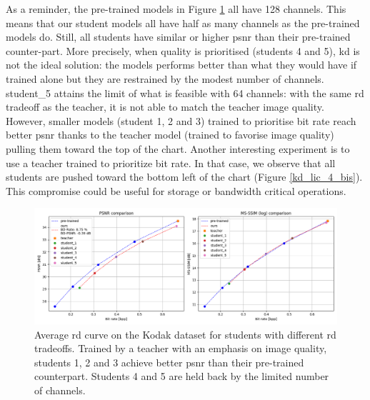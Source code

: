 \documentclass{article}
\begin{document}
As a reminder, the pre-trained models in Figure \ref{kd_lic_4} all have 128 channels. This means that our student models all have half as many channels as the pre-trained models do. Still, all students have similar or higher \acrshort{psnr} than their pre-trained counter-part. More precisely, when quality is prioritised (students 4 and 5), \acrshort{kd} is not the ideal solution: the models performs better than what they would have if trained alone but they are restrained by the modest number of channels. \textsf{student\_5} attains the limit of what is feasible with 64 channels: with the same \acrshort{rd} tradeoff as the teacher, it is not able to match the teacher image quality. However, smaller models (student 1, 2 and 3) trained to prioritise bit rate reach better \acrshort{psnr} thanks to the teacher model (trained to favorise image quality) pulling them toward the top of the chart. Another interesting experiment is to use a teacher trained to prioritize bit rate. In that case, we observe that all students are pushed toward the bottom left of the chart (Figure \ref{kd_lic_4_bis}). This compromise could be useful for storage or bandwidth critical operations.

\begin{figure}
    \centering
    \includegraphics[width=15cm]{kd_lic_rd_lambda_1.png}
    \caption[Average \acrshort{rd} curve on the Kodak dataset for students with different \acrshort{rd} tradeoffs.]{Average \acrshort{rd} curve on the Kodak dataset for students with different \acrshort{rd} tradeoffs. Trained by a teacher with an emphasis on image quality, students 1, 2 and 3 achieve better \acrshort{psnr} than their pre-trained counterpart. Students 4 and 5 are held back by the limited number of channels.}
    \label{kd_lic_4}
\end{figure}
\end{document}
